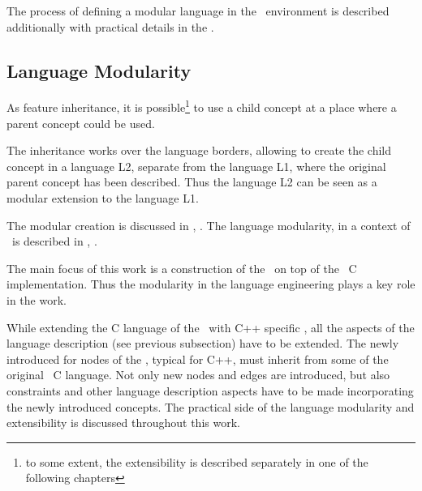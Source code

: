 The process of defining a modular language in the \jbmps\ environment is described additionally with practical details in the .

\subsection{Language Modularity}

As  feature inheritance, it is possible\footnote{to some extent, the extensibility is described separately in one of the following chapters} 
to use a child concept at a place where a parent concept could be used. 

The inheritance works over the language borders, allowing to create the child concept
in a language L2, separate from the language L1, where the original parent concept has been described. Thus the language L2 can be seen as a modular extension to the
language L1. 

The modular  creation is discussed in \cite{1998_hudak_modular_dsl_and_tools}, \cite{2006_wyk_modular_dsl_extensions}. 
The language modularity, in a context of \jbmps\ is described in \cite{2012_ratiu_modular_dsls_and_analyses}, \cite{Voelter2011}.

The main focus of this work is a construction of the \cpppl\ on top of the \mbdr\ C implementation. Thus the modularity in the language engineering 
plays a key role in the work.

While extending the C language of the \mbdr\ with C++ specific , all the aspects of the language description (see previous subsection) have
to be extended. The newly introduced  for nodes of the , typical for C++, must inherit from some  of the original 
\mbp\ C language. Not only new nodes and edges are introduced, but also constraints and other language description aspects have to be made incorporating the
newly introduced concepts. The practical side of the language modularity and extensibility is discussed throughout this work.


